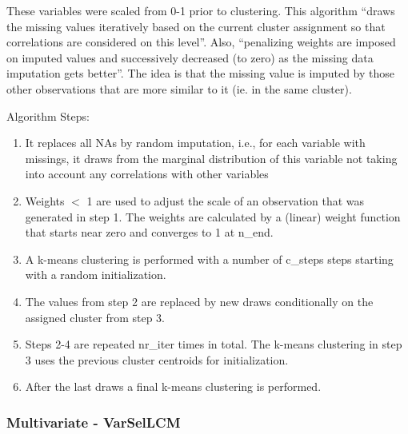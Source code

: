 \documentclass[11pt, a4paper]{article}
\begin{document}
These variables were scaled from 0-1 prior to clustering.
This algorithm ``draws the missing values iteratively based on the current cluster assignment so that correlations are considered on this level''. Also, ``penalizing weights are imposed on imputed values and successively decreased (to zero) as the missing data imputation gets better''. The idea is that the missing value is imputed by those other observations that are more similar to it (ie. in the same cluster).
\par
Algorithm Steps:
\begin{enumerate}
\item It replaces all NAs by random imputation, i.e., for each variable with missings, it draws from the marginal distribution of this variable not taking into account any correlations with other variables 
\item Weights $<$ 1 are used to adjust the scale of an observation that was generated in step 1. The weights are calculated by a (linear) weight function that starts near zero and converges to 1 at n\_end. 
\item A k-means clustering is performed with a number of c\_steps steps starting with a random initialization. 
\item The values from step 2 are replaced by new draws conditionally on the assigned cluster from step 3. 
\item Steps 2-4 are repeated nr\_iter times in total. The k-means clustering in step 3 uses the previous cluster centroids for initialization. 
\item After the last draws a final k-means clustering is performed.
\end{enumerate}






\subsubsection{Multivariate - VarSelLCM}
\end{document}
